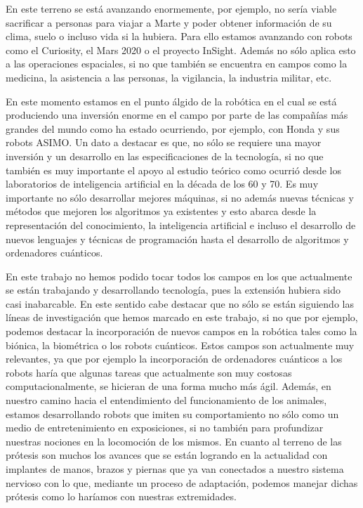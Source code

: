 \documentclass[a4paper,11pt]{article}
\begin{document}
\vspace{10px}

En este terreno se está avanzando enormemente, por ejemplo, no sería viable sacrificar a personas para viajar a Marte y poder obtener información de su clima, suelo o incluso vida si la hubiera. Para ello estamos avanzando con robots como el Curiosity, el Mars 2020 o el proyecto InSight. Además no sólo aplica esto a las operaciones espaciales, si no que también se encuentra en campos como la medicina, la asistencia a las personas, la vigilancia, la industria militar, etc. 

\vspace{10px}

En este momento estamos en el punto álgido de la robótica en el cual se está produciendo una inversión enorme en el campo por parte de las compañías más grandes del mundo como ha estado ocurriendo, por ejemplo, con Honda y sus robots ASIMO. Un dato a destacar es que, no sólo se requiere una mayor inversión y un desarrollo en las especificaciones de la tecnología, si no que también es muy importante el apoyo al estudio teórico como ocurrió desde los laboratorios de inteligencia artificial en la década de los 60 y 70. Es muy importante no sólo desarrollar mejores máquinas, si no además nuevas técnicas y métodos que mejoren los algoritmos ya existentes y esto abarca desde la representación del conocimiento, la inteligencia artificial e incluso el desarrollo de nuevos lenguajes y técnicas de programación hasta el desarrollo de algoritmos y ordenadores cuánticos.

\vspace{10px}

En este trabajo no hemos podido tocar todos los campos en los que actualmente se están trabajando y desarrollando tecnología, pues la extensión hubiera sido casi inabarcable. En este sentido cabe destacar que no sólo se están siguiendo las líneas de investigación que hemos marcado en este trabajo, si no que por ejemplo, podemos destacar la incorporación de nuevos campos en la robótica tales como la biónica, la biométrica o los robots cuánticos. Estos campos son actualmente muy relevantes, ya que por ejemplo la incorporación de ordenadores cuánticos a los robots haría que algunas tareas que actualmente son muy costosas computacionalmente, se hicieran de una forma mucho más ágil. Además, en nuestro camino hacia el entendimiento del funcionamiento de los animales, estamos desarrollando robots que imiten su comportamiento no sólo como un medio de entretenimiento en exposiciones, si no también para profundizar nuestras nociones en la locomoción de los mismos. En cuanto al terreno de las prótesis son muchos los avances que se están logrando en la actualidad con implantes de manos, brazos y piernas que ya van conectados a nuestro sistema nervioso con lo que, mediante un proceso de adaptación, podemos manejar dichas prótesis como lo haríamos con nuestras extremidades. 
\end{document}
